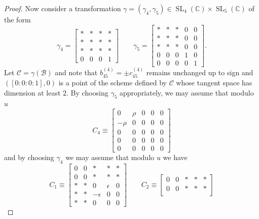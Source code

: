 \documentclass[10pt,a4paper]{amsart}
\DeclareMathOperator{\SL}{SL}
\newcommand{\CC}{\mathbb{C}}
\begin{document}
\begin{proof}
Now consider a transformation $\gamma = (\gamma_4, \gamma_5) \in \SL_4(\CC) \times \SL_5(\CC)$ of the form
\begin{equation*}
    \gamma_4 = \begin{bmatrix}
      * & * & * & * \\
      * & * & * & * \\
      * & * & * & * \\
      0 & 0 & 0 & 1 
    \end{bmatrix}  
    \qquad
    \gamma_5 = \begin{bmatrix}
        * & * & * & 0 & 0 \\
        * & * & * & 0 & 0 \\
        * & * & * & 0 & 0 \\
        0 & 0 & 0 & 1 & 0 \\
        0 & 0 & 0 & 0 & 1 
    \end{bmatrix}.
\end{equation*}
Let $\mathcal{C} = \gamma(\mathcal{B})$ and note that $b_{45}^{(4)} = \pm c_{45}^{(4)}$ remains unchanged up to sign and $([0:0:0:1], 0)$ is a point of the scheme defined by $\mathcal{C}$ whose tangent space has dimension at least $2$. By choosing $\gamma_5$ appropriately, we may assume that modulo $u$ 
\begin{equation*}    
    C_4 \equiv 
    \begin{bmatrix}
      0 & \rho & 0 & 0 & 0 \\
      -\rho & 0 & 0 & 0 & 0 \\
      0 & 0 & 0 & 0 & 0 \\
      0 & 0 & 0 & 0 & 0 \\
      0 & 0 & 0 & 0 & 0 
    \end{bmatrix}
\end{equation*}
and by choosing $\gamma_4$ we may assume that modulo $u$ we have
\begin{equation*}
  C_1 \equiv \begin{bmatrix}
      0 & 0 & * & * & * \\
      0 & 0 & * & * & * \\
      * & * & 0 & \epsilon & 0 \\
      * & * & -\epsilon & 0 & 0 \\
      * & * & 0 & 0 & 0 
  \end{bmatrix}
  \qquad 
  C_2 \equiv \begin{bmatrix}
      0 & 0 & * & * & * \\
      0 & 0 & * & * & * \\

\end{bmatrix}
\end{equation*}
\end{proof}
\end{document}
